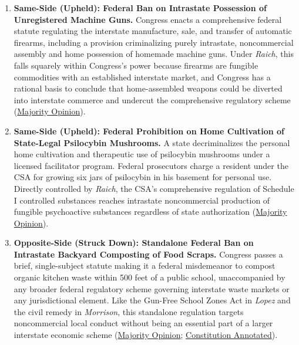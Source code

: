 \documentclass[12pt]{article}
\begin{document}
\begin{enumerate}
\item \textbf{Same-Side (Upheld): Federal Ban on Intrastate Possession of Unregistered Machine Guns.} Congress enacts a comprehensive federal statute regulating the interstate manufacture, sale, and transfer of automatic firearms, including a provision criminalizing purely intrastate, noncommercial assembly and home possession of homemade machine guns. Under \textit{Raich}, this falls squarely within Congress's power because firearms are fungible commodities with an established interstate market, and Congress has a rational basis to conclude that home-assembled weapons could be diverted into interstate commerce and undercut the comprehensive regulatory scheme (\href{https://www.law.cornell.edu/supct/html/03-1454.ZO.html}{Majority Opinion}).

\item \textbf{Same-Side (Upheld): Federal Prohibition on Home Cultivation of State-Legal Psilocybin Mushrooms.} A state decriminalizes the personal home cultivation and therapeutic use of psilocybin mushrooms under a licensed facilitator program. Federal prosecutors charge a resident under the CSA for growing six jars of psilocybin in his basement for personal use. Directly controlled by \textit{Raich}, the CSA's comprehensive regulation of Schedule I controlled substances reaches intrastate noncommercial production of fungible psychoactive substances regardless of state authorization (\href{https://www.law.cornell.edu/supct/html/03-1454.ZO.html}{Majority Opinion}).

\item \textbf{Opposite-Side (Struck Down): Standalone Federal Ban on Intrastate Backyard Composting of Food Scraps.} Congress passes a brief, single-subject statute making it a federal misdemeanor to compost organic kitchen waste within 500 feet of a public school, unaccompanied by any broader federal regulatory scheme governing interstate waste markets or any jurisdictional element. Like the Gun-Free School Zones Act in \textit{Lopez} and the civil remedy in \textit{Morrison}, this standalone regulation targets noncommercial local conduct without being an essential part of a larger interstate economic scheme (\href{https://www.law.cornell.edu/supct/html/03-1454.ZO.html}{Majority Opinion}; \href{https://www.law.cornell.edu/constitution-conan/amendment-10/the-commerce-clause-and-the-tenth-amendment}{Constitution Annotated}).


\end{enumerate}
\end{document}
